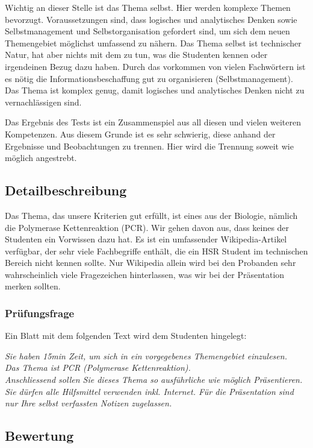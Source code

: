 Wichtig an dieser Stelle ist das Thema selbst. Hier werden komplexe Themen bevorzugt. Voraussetzungen sind, dass logisches und analytisches Denken sowie Selbstmanagement und Selbstorganisation gefordert sind, um sich dem neuen Themengebiet möglichst umfassend zu nähern. Das Thema selbst ist technischer Natur, hat aber nichts mit dem zu tun, was die Studenten kennen oder irgendeinen Bezug dazu haben. Durch das vorkommen von vielen Fachwörtern ist es nötig die Informationsbeschaffung gut zu organisieren (Selbstmanagement). Das Thema ist komplex genug, damit logisches und analytisches Denken nicht zu vernachlässigen sind.

Das Ergebnis des Tests ist ein Zusammenspiel aus all diesen und vielen weiteren Kompetenzen. Aus diesem Grunde ist es sehr schwierig, diese anhand der Ergebnisse und Beobachtungen zu trennen. Hier wird die Trennung soweit wie möglich angestrebt.

\subsection{Detailbeschreibung}

Das Thema, das unsere Kriterien gut erfüllt, ist eines aus der Biologie, nämlich die Polymerase Kettenreaktion (PCR). Wir gehen davon aus, dass keines der Studenten ein Vorwissen dazu hat. Es ist ein umfassender Wikipedia-Artikel verfügbar, der sehr viele Fachbegriffe enthält, die ein HSR Student im technischen Bereich nicht kennen sollte. Nur Wikipedia allein wird bei den Probanden sehr wahrscheinlich viele Fragezeichen hinterlassen, was wir bei der Präsentation merken sollten. 

\subsubsection{Prüfungsfrage}
Ein Blatt mit dem folgenden Text wird dem Studenten hingelegt:

\textit{Sie haben 15min Zeit, um sich in ein vorgegebenes Themengebiet einzulesen. \\\vspace*{2mm}
Das Thema ist PCR (Polymerase Kettenreaktion). \\
Anschliessend sollen Sie dieses Thema so ausführliche wie möglich Präsentieren. Sie dürfen alle Hilfsmittel verwenden inkl. Internet. Für die Präsentation sind nur Ihre selbst verfassten Notizen zugelassen.}
\subsection{Bewertung}

